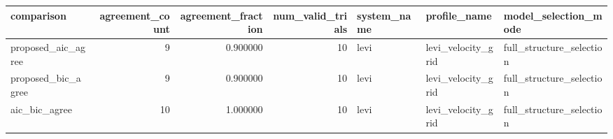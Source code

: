 \begin{tabular}{lrrrlll}
\toprule
comparison & agreement_count & agreement_fraction & num_valid_trials & system_name & profile_name & model_selection_mode \\
\midrule
proposed_aic_agree & 9 & 0.900000 & 10 & levi & levi_velocity_grid & full_structure_selection \\
proposed_bic_agree & 9 & 0.900000 & 10 & levi & levi_velocity_grid & full_structure_selection \\
aic_bic_agree & 10 & 1.000000 & 10 & levi & levi_velocity_grid & full_structure_selection \\
\bottomrule
\end{tabular}
